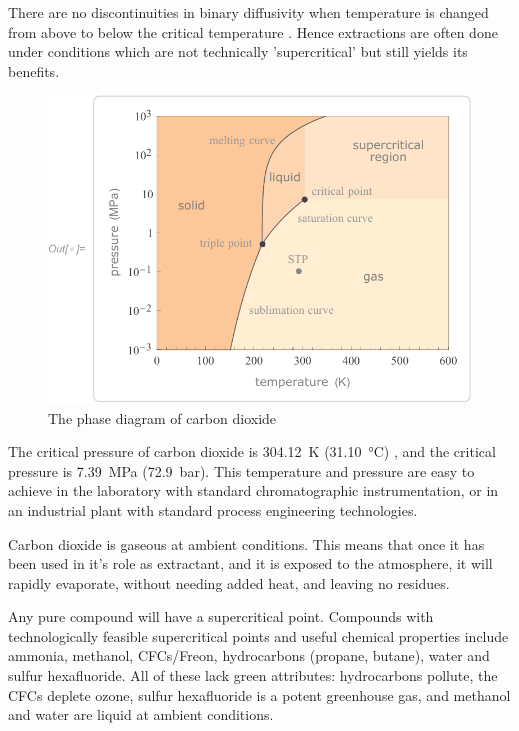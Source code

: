 There are no discontinuities in binary diffusivity when temperature is changed
from above to below the critical temperature \autocite{Lauer1983}. Hence
extractions are often done under conditions which are not technically
'supercritical' but still yields its benefits.


\begin{figure}
\centering
\includegraphics[width=\textwidth]{Figures/CO2PhaseDiagram}
\decoRule
\caption[The carbon dioxide phase diagram]{The phase diagram of carbon dioxide}
\label{fig:co2phase}
\end{figure}

The critical pressure of carbon dioxide is \SI{304.12}{\kelvin}
(\SI{31.10}{\celsius}) , and the critical pressure is \SI{7.39}{\mega\pascal}
(\SI{72.9}{\bar}). This temperature and pressure are easy to achieve in the
laboratory with standard chromatographic instrumentation, or in an industrial
plant with standard process engineering technologies.

Carbon dioxide is gaseous at ambient conditions. This means that once it has
been used in it's role as extractant, and it is exposed to the atmosphere, it
will rapidly evaporate, without needing added heat, and leaving no residues.

Any pure compound will have a supercritical point. Compounds with
technologically feasible supercritical points and useful chemical properties
include ammonia, methanol, CFCs/Freon, hydrocarbons (propane, butane), water and
sulfur hexafluoride. All of these lack green attributes: hydrocarbons pollute,
the CFCs deplete ozone, sulfur hexafluoride is a potent greenhouse gas, and
methanol and water are liquid at ambient conditions.

